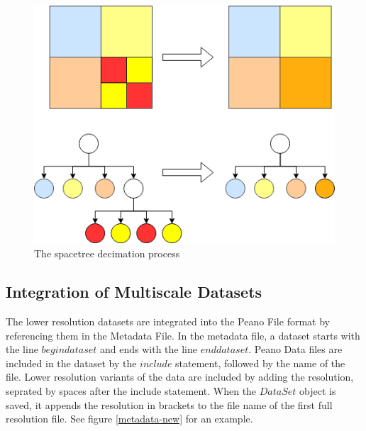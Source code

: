 \documentclass[12pt,a4paper]{article}
\begin{document}
\begin{figure}[h]
\centering
\includegraphics[scale=0.5]{spacetree-collapse}
\caption{The spacetree decimation process}
\label{spacetree-decimation}
\end{figure}

\subsection{Integration of Multiscale Datasets}
The lower resolution datasets are integrated into the Peano File format by referencing them in the Metadata File. In the metadata file, a dataset starts with the line $begin dataset$ and ends with the line $end dataset$. Peano Data files are included in the dataset by the $include$ statement, followed by the name of the file. Lower resolution variants of the data are included by adding the resolution, seprated by spaces after the include statement. When the $DataSet$ object is saved, it appends the resolution in brackets to the file name of the first full resolution file. See figure \ref{metadata-new} for an example.
\end{document}
